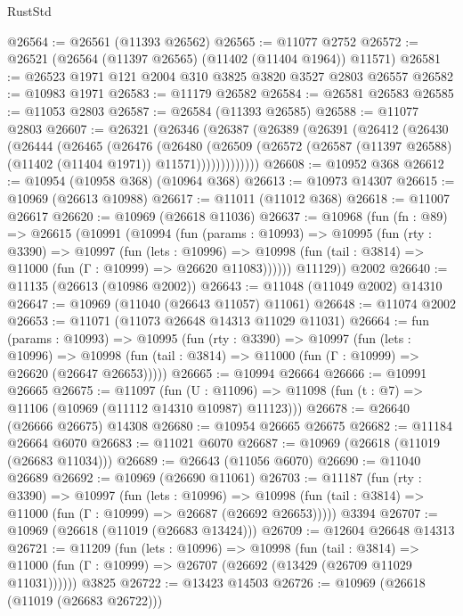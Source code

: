 \begin{lexlean}{RustStd}
\begin{coremodule}
@26564 := @26561 (@11393 @26562)
@26565 := @11077 @2752
@26572 := @26521 (@26564 (@11397 @26565) (@11402 (@11404 @1964)) @11571)
@26581 := @26523 @1971 @121 @2004 @310 @3825 @3820 @3527 @2803 @26557
@26582 := @10983 @1971
@26583 := @11179 @26582
@26584 := @26581 @26583
@26585 := @11053 @2803
@26587 := @26584 (@11393 @26585)
@26588 := @11077 @2803
@26607 := @26321
    (@26346
      (@26387
        (@26389
          (@26391
            (@26412
              (@26430
                (@26444
                  (@26465
                    (@26476
                      (@26480
                        (@26509
                          (@26572
                            (@26587 (@11397 @26588) (@11402 (@11404 @1971)) @11571)))))))))))))
@26608 := @10952 @368
@26612 := @10954 (@10958 @368) (@10964 @368)
@26613 := @10973 @14307
@26615 := @10969 (@26613 @10988)
@26617 := @11011 (@11012 @368)
@26618 := @11007 @26617
@26620 := @10969 (@26618 @11036)
@26637 := @10968
    (fun (fn : @89) =>
    @26615
      (@10991
        (@10994
          (fun (params : @10993) =>
          @10995
            (fun (rty : @3390) =>
            @10997
              (fun (lets : @10996) =>
              @10998 (fun (tail : @3814) => @11000 (fun (Γ : @10999) => @26620 @11083))))))
        @11129))
    @2002
@26640 := @11135 (@26613 (@10986 @2002))
@26643 := @11048 (@11049 @2002) @14310
@26647 := @10969 (@11040 (@26643 @11057) @11061)
@26648 := @11074 @2002
@26653 := @11071 (@11073 @26648 @14313 @11029 @11031)
@26664 := fun (params : @10993) =>
  @10995
    (fun (rty : @3390) =>
    @10997
      (fun (lets : @10996) =>
      @10998 (fun (tail : @3814) => @11000 (fun (Γ : @10999) => @26620 (@26647 @26653)))))
@26665 := @10994 @26664
@26666 := @10991 @26665
@26675 := @11097
    (fun (U : @11096) => @11098 (fun (t : @7) => @11106 (@10969 (@11112 @14310 @10987) @11123)))
@26678 := @26640 (@26666 @26675) @14308
@26680 := @10954 @26665 @26675
@26682 := @11184 @26664 @6070
@26683 := @11021 @6070
@26687 := @10969 (@26618 (@11019 (@26683 @11034)))
@26689 := @26643 (@11056 @6070)
@26690 := @11040 @26689
@26692 := @10969 (@26690 @11061)
@26703 := @11187
    (fun (rty : @3390) =>
    @10997
      (fun (lets : @10996) =>
      @10998 (fun (tail : @3814) => @11000 (fun (Γ : @10999) => @26687 (@26692 @26653)))))
    @3394
@26707 := @10969 (@26618 (@11019 (@26683 @13424)))
@26709 := @12604 @26648 @14313
@26721 := @11209
    (fun (lets : @10996) =>
    @10998
      (fun (tail : @3814) =>
      @11000 (fun (Γ : @10999) => @26707 (@26692 (@13429 (@26709 @11029 @11031))))))
    @3825
@26722 := @13423 @14503
@26726 := @10969 (@26618 (@11019 (@26683 @26722)))

\end{coremodule}
\end{lexlean}
